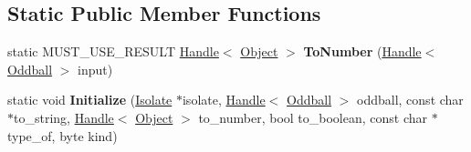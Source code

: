 \subsection*{Static Public Member Functions}
\begin{DoxyCompactItemize}
\item 
static M\+U\+S\+T\+\_\+\+U\+S\+E\+\_\+\+R\+E\+S\+U\+LT \hyperlink{classv8_1_1internal_1_1_handle}{Handle}$<$ \hyperlink{classv8_1_1internal_1_1_object}{Object} $>$ {\bfseries To\+Number} (\hyperlink{classv8_1_1internal_1_1_handle}{Handle}$<$ \hyperlink{classv8_1_1internal_1_1_oddball}{Oddball} $>$ input)\hypertarget{classv8_1_1internal_1_1_oddball_a553306e19ed7f09b101ec2d0aeea18c9}{}\label{classv8_1_1internal_1_1_oddball_a553306e19ed7f09b101ec2d0aeea18c9}

\item 
static void {\bfseries Initialize} (\hyperlink{classv8_1_1internal_1_1_isolate}{Isolate} $\ast$isolate, \hyperlink{classv8_1_1internal_1_1_handle}{Handle}$<$ \hyperlink{classv8_1_1internal_1_1_oddball}{Oddball} $>$ oddball, const char $\ast$to\+\_\+string, \hyperlink{classv8_1_1internal_1_1_handle}{Handle}$<$ \hyperlink{classv8_1_1internal_1_1_object}{Object} $>$ to\+\_\+number, bool to\+\_\+boolean, const char $\ast$type\+\_\+of, byte kind)\hypertarget{classv8_1_1internal_1_1_oddball_af41e9d6d2819db26e1f34ccd9b498a40}{}\label{classv8_1_1internal_1_1_oddball_af41e9d6d2819db26e1f34ccd9b498a40}

\end{DoxyCompactItemize}
